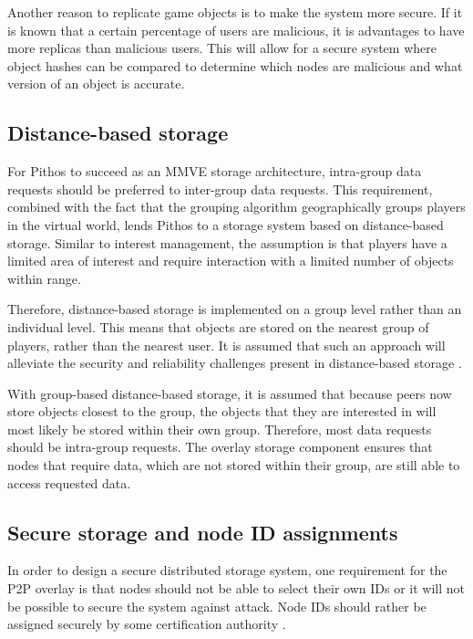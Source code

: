 Another reason to replicate game objects is to make the system more secure. If it is known that a certain percentage of users are malicious, it is
advantages to have more replicas than malicious users. This will allow for a secure system where object hashes can be compared to determine which
nodes are malicious and what version of an object is accurate.

\subsection{Distance-based storage}
\label{distance_based}

For Pithos to succeed as an MMVE storage architecture, intra-group data requests should be preferred to inter-group data requests. This requirement,
combined with the fact that the grouping algorithm geographically groups players in the virtual world, lends Pithos to a storage system based on
distance-based storage. Similar to interest management, the assumption is that players have a limited area of interest and require interaction with a
limited number of objects within range.

Therefore, distance-based storage is implemented on a group level rather than an individual level. This means that objects are stored on the nearest
group of players, rather than the nearest user. It is assumed that such an approach will alleviate the security and reliability challenges present in
distance-based storage \cite{gilmore_p2p_mmog_state_persistency}.

With group-based distance-based storage, it is assumed that because peers now store objects closest to the group, the objects that they are
interested in will most likely be stored within their own group. Therefore, most data requests should be intra-group requests. The overlay storage
component ensures that nodes that require data, which are not stored within their group, are still able to access requested data.

\subsection{Secure storage and node ID assignments}
\label{secure_ids}

In order to design a secure distributed storage system, one requirement for the P2P overlay is that nodes should not be able to select their own IDs
or it will not be possible to secure the system against attack. Node IDs should rather be assigned securely by some certification authority
\cite{secure_overlay_routing}.

